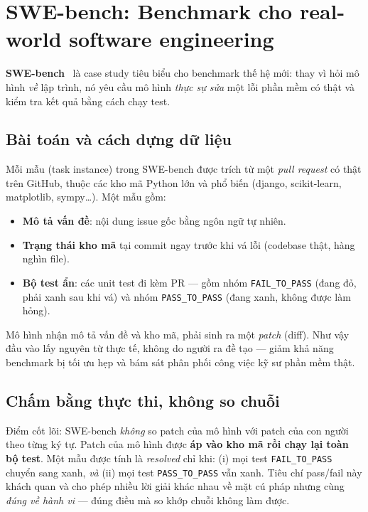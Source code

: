 \section{SWE-bench: Benchmark cho real-world software engineering}
\label{sec:swe_bench}

\textbf{SWE-bench}~\cite{swebench} là case study tiêu biểu cho benchmark
thế hệ mới: thay vì hỏi mô hình \emph{về} lập trình, nó yêu cầu mô hình \emph{thực
sự sửa} một lỗi phần mềm có thật và kiểm tra kết quả bằng cách chạy test.

\subsection{Bài toán và cách dựng dữ liệu}

Mỗi mẫu (task instance) trong SWE-bench được trích từ một \emph{pull request} có
thật trên GitHub, thuộc các kho mã Python lớn và phổ biến (django, scikit-learn,
matplotlib, sympy\ldots). Một mẫu gồm:

\begin{itemize}
  \item \textbf{Mô tả vấn đề}: nội dung issue gốc bằng ngôn ngữ tự nhiên.
  \item \textbf{Trạng thái kho mã} tại commit ngay trước khi vá lỗi (codebase
    thật, hàng nghìn file).
  \item \textbf{Bộ test ẩn}: các unit test đi kèm PR --- gồm nhóm
    \texttt{FAIL\_TO\_PASS} (đang đỏ, phải xanh sau khi vá) và nhóm
    \texttt{PASS\_TO\_PASS} (đang xanh, không được làm hỏng).
\end{itemize}

Mô hình nhận mô tả vấn đề và kho mã, phải sinh ra một \emph{patch} (diff). Như vậy
đầu vào lấy nguyên từ thực tế, không do người ra đề tạo --- giảm khả năng benchmark
bị tối ưu hẹp và bám sát phân phối công việc kỹ sư phần mềm thật.

\subsection{Chấm bằng thực thi, không so chuỗi}

Điểm cốt lõi: SWE-bench \emph{không} so patch của mô hình với patch của con người
theo từng ký tự. Patch của mô hình được \textbf{áp vào kho mã rồi chạy lại toàn bộ
test}. Một mẫu được tính là \emph{resolved} chỉ khi: (i) mọi test
\texttt{FAIL\_TO\_PASS} chuyển sang xanh, \emph{và} (ii) mọi test
\texttt{PASS\_TO\_PASS} vẫn xanh. Tiêu chí pass/fail này khách quan và cho phép
nhiều lời giải khác nhau về mặt cú pháp nhưng cùng \emph{đúng về hành vi} --- đúng
điều mà so khớp chuỗi không làm được.


